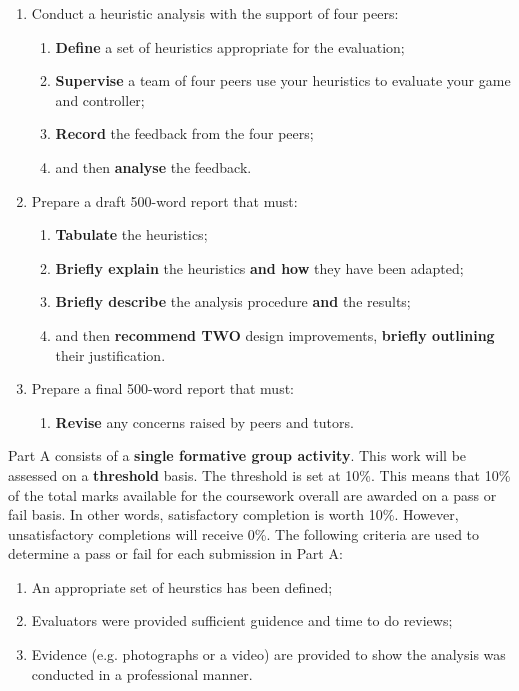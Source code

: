 \documentclass{../fal_assignment}
\begin{document}
\begin{enumerate}[label=(\alph*)]
    \item Conduct a heuristic analysis with the support of four peers:
    	\begin{enumerate}[label=\roman*.]
    		\item \textbf{Define} a set of heuristics appropriate for the evaluation;
    		\item \textbf{Supervise} a team of four peers use your heuristics to evaluate your game and controller;
    		\item \textbf{Record} the feedback from the four peers;
    		\item and then \textbf{analyse} the feedback.
	\end{enumerate}
    \item Prepare a draft 500-word report that must:
    	\begin{enumerate}[label=\roman*.]
    	          \item \textbf{Tabulate} the heuristics; 
    	          \item \textbf{Briefly explain} the heuristics \textbf{and how} they have been adapted; 
    		\item \textbf{Briefly describe} the analysis procedure \textbf{and} the results;    	
    		\item and then \textbf{recommend TWO} design improvements, \textbf{briefly outlining} their justification.
	\end{enumerate}
    \item Prepare a final 500-word report that must:
    	\begin{enumerate}[label=\roman*.]
    	          \item \textbf{Revise} any concerns raised by peers and tutors. 
	\end{enumerate}
\end{enumerate}

Part A consists of a \textbf{single formative group activity}. This work will be assessed on a \textbf{threshold} basis. The threshold is set at 10\%. This means that 10\% of the total marks available for the coursework overall are awarded on a pass or fail basis. In other words, satisfactory completion is worth 10\%. However, unsatisfactory completions will receive 0\%. The following criteria are used to determine a pass or fail for each submission in Part A:

\begin{enumerate}[label=(\alph*)]
	\item An appropriate set of heurstics has been defined;
	\item Evaluators were provided sufficient guidence and time to do reviews;
	\item Evidence (e.g. photographs or a video) are provided to show the analysis was conducted in a professional manner.
\end{enumerate}
\end{document}
